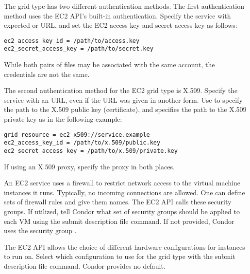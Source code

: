 The  grid type has two different authentication methods.
The first authentication method uses the EC2 API's built-in authentication.
Specify the service with expected  or  URL,
and set the EC2 access key and secret access key as follows:

\begin{verbatim}
ec2_access_key_id = /path/to/access.key
ec2_secret_access_key = /path/to/secret.key
\end{verbatim}

While both pairs of files may be associated with the same account, 
the credentials are not the same.

The second authentication method for the EC2 grid type is X.509.
Specify the service with an  URL, 
even if the URL was given in another form.  
Use  to 
specify the path to the X.509 public key (certificate),
and  specifies the path to the X.509 
private key as in the following example:

\begin{verbatim}
grid_resource = ec2 x509://service.example
ec2_access_key_id = /path/to/x.509/public.key
ec2_secret_access_key = /path/to/x.509/private.key
\end{verbatim}

If using an X.509 proxy, specify the proxy in both places.


An EC2 service uses a firewall to restrict network access to 
the virtual machine instances it runs.
Typically, no incoming connections are allowed.
One can define sets of firewall rules and give them names.
The EC2 API calls these security groups. 
If utilized, tell Condor what set of security
groups should be applied to each VM using the
 submit description file command.
If not provided, Condor uses the security group .

The EC2 API allows the choice of different hardware configurations 
for instances to run on.
Select which configuration to use for the  grid type
with the  submit description file command.
Condor provides no default.

